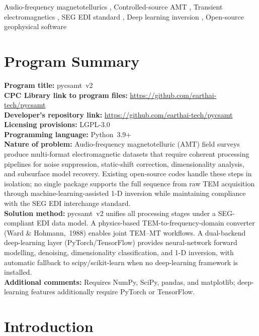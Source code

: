\documentclass[review,12pt]{elsarticle}
\begin{document}
\begin{frontmatter}
\begin{keyword}
Audio-frequency magnetotellurics \sep
Controlled-source AMT \sep
Transient electromagnetics \sep
SEG EDI standard \sep
Deep learning inversion \sep
Open-source geophysical software
\end{keyword}

\end{frontmatter}

\section*{Program Summary}
\noindent
\textbf{Program title:} pycsamt~v2\\
\textbf{CPC Library link to program files:} \url{https://github.com/earthai-tech/pycsamt}\\
\textbf{Developer's repository link:} \url{https://github.com/earthai-tech/pycsamt}\\
\textbf{Licensing provisions:} LGPL-3.0\\
\textbf{Programming language:} Python~3.9+\\
\textbf{Nature of problem:}
Audio-frequency magnetotelluric (AMT) field surveys produce multi-format
electromagnetic datasets that require coherent processing pipelines for noise
suppression, static-shift correction, dimensionality analysis, and
subsurface model recovery.  Existing open-source codes handle these steps
in isolation; no single package supports the full sequence from raw TEM
acquisition through machine-learning-assisted 1-D inversion while maintaining
compliance with the SEG EDI interchange standard.\\
\textbf{Solution method:}
pycsamt~v2 unifies all processing stages under a SEG-compliant EDI data model.
A physics-based TEM-to-frequency-domain converter (Ward \& Hohmann,~1988)
enables joint TEM–MT workflows.  A dual-backend deep-learning layer
(PyTorch/TensorFlow) provides neural-network forward modelling,
denoising, dimensionality classification, and 1-D inversion, with automatic
fallback to scipy/scikit-learn when no deep-learning framework is installed.\\
\textbf{Additional comments:} Requires NumPy, SciPy, pandas, and matplotlib;
deep-learning features additionally require PyTorch or TensorFlow.

\linenumbers

\section{Introduction}
\label{sec:intro}
\end{document}
